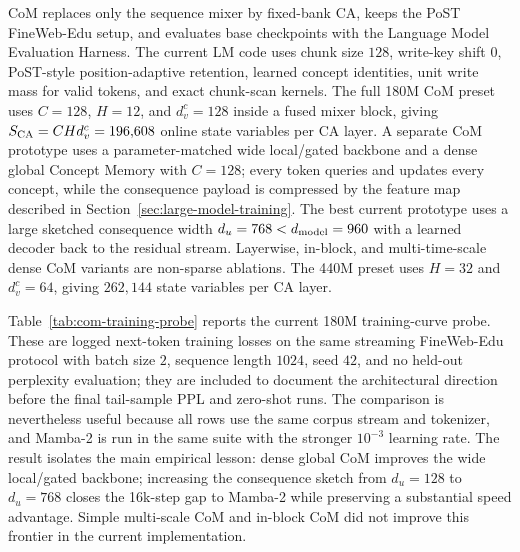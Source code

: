 CoM replaces only the sequence mixer by fixed-bank CA, keeps the PoST FineWeb-Edu setup, and evaluates base checkpoints with the Language Model Evaluation Harness. The current LM code uses chunk size $128$, write-key shift $0$, PoST-style position-adaptive retention, learned concept identities, unit write mass for valid tokens, and exact chunk-scan kernels. The full 180M CoM preset uses $C=128$, $H=12$, and $d_v^c=128$ inside a fused mixer block, giving $S_{\rm CA}=C H d_v^c=196{,}608$ online state variables per CA layer. A separate CoM prototype uses a parameter-matched wide local/gated backbone and a dense global Concept Memory with $C=128$; every token queries and updates every concept, while the consequence payload is compressed by the feature map described in Section~\ref{sec:large-model-training}. The best current prototype uses a large sketched consequence width $d_u=768<d_{\rm model}=960$ with a learned decoder back to the residual stream. Layerwise, in-block, and multi-time-scale dense CoM variants are non-sparse ablations. The 440M preset uses $H=32$ and $d_v^c=64$, giving $262{,}144$ state variables per CA layer.

Table~\ref{tab:com-training-probe} reports the current 180M training-curve probe. These are logged next-token training losses on the same streaming FineWeb-Edu protocol with batch size $2$, sequence length $1024$, seed $42$, and no held-out perplexity evaluation; they are included to document the architectural direction before the final tail-sample PPL and zero-shot runs. The comparison is nevertheless useful because all rows use the same corpus stream and tokenizer, and Mamba-2 is run in the same suite with the stronger $10^{-3}$ learning rate. The result isolates the main empirical lesson: dense global CoM improves the wide local/gated backbone; increasing the consequence sketch from $d_u=128$ to $d_u=768$ closes the 16k-step gap to Mamba-2 while preserving a substantial speed advantage. Simple multi-scale CoM and in-block CoM did not improve this frontier in the current implementation.

